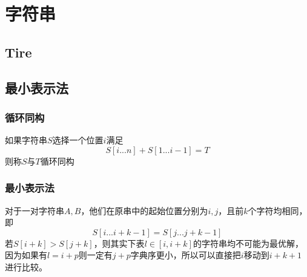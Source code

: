 \chapter{字符串}





\section{Tire}



\section{最小表示法}
\subsection{循环同构}
如果字符串$S$选择一个位置$i$满足
$$
S[i...n]+S[1...i-1] = T
$$
则称$S$与$T$循环同构

\subsection{最小表示法}
对于一对字符串$A,B$，他们在原串中的起始位置分别为$i,j$，且前$k$个字符均相同，即
$$
S[i...i+k-1] =S[j...j+k-1]
$$
若$S[i+k]>S[j+k]$，则其实下表$l\in[i,i+k]$的字符串均不可能为最优解，因为如果有$l=i+p$则一定有$j+p$字典序更小，所以可以直接把$i$移动到$i+k+1$进行比较。

